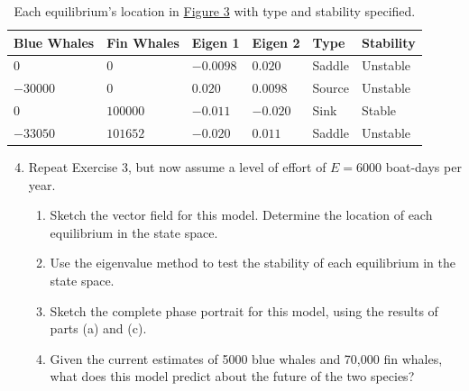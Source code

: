 \documentclass[12pt, oneside]{book}
\newenvironment{solution}{\textit{Solution.}}
\newcommand{\sol}[1]{
    \begin{customframedproof}[linecolor=orangehdx!75,]
        \begin{solution}
        #1
        \end{solution}
    \end{customframedproof}
}
\begin{document}
\newpage

\begin{table}[t]
    \centering
    \begin{tabular}{llllll}
        \toprule
        \textbf{Blue Whales} & \textbf{Fin Whales} & \textbf{Eigen 1} & \textbf{Eigen 2} & \textbf{Type} & \textbf{Stability} \\\midrule
        \(0\) & \(0\) & \(-0.0098\) & \(0.020\) & Saddle & Unstable \\
        \(-30000\) & \(0\) & \(0.020\) & \(0.0098\) & Source & Unstable \\
        \(0\) & \(100000\) & \(-0.011\) & \(-0.020\) & Sink & Stable \\
        \(-33050\) & \(101652\) & \(-0.020\) & \(0.011\) & Saddle & Unstable\\
        \bottomrule
    \end{tabular}
    \caption{Each equilibrium's location in \hyperref[fig:ex4pta]{Figure 3} with type and stability specified.}\label{tab:ex4pta}
\end{table}

\begin{enumerate}
    \setcounter{enumi}{3}
    \item Repeat Exercise 3, but now assume a level of effort of \(E = 6000\) boat-days per year.
    \begin{enumerate}
        \item  Sketch the vector field for this model. Determine the location of each equilibrium in the state space.
        \item Use the eigenvalue method to test the stability of each equilibrium in the state space.
        \setcounter{enumii}{3}
        \item  Sketch the complete phase portrait for this model, using the results of parts (a) and (c).
        \item Given the current estimates of 5000 blue whales and 70,000 fin whales, what does this model predict about the future of the two species? 
    \end{enumerate}
\end{enumerate}
\end{document}
